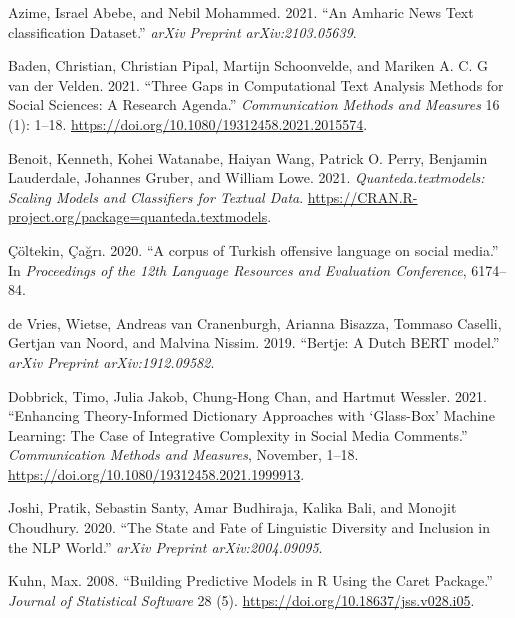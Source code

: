 \documentclass[
]{ccr}
\newlength{\cslhangindent}
\newlength{\cslentryspacingunit} %
\newenvironment{CSLReferences}[2] %
 {%
  \setlength{\parindent}{0pt}
  \ifodd #1
  \let\oldpar\par
  \def\par{\hangindent=\cslhangindent\oldpar}
  \fi
  \setlength{\parskip}{#2\cslentryspacingunit}
 }%
 {}
\begin{document}
\hypertarget{refs}{}
\begin{CSLReferences}{1}{0}
\leavevmode{}%
Azime, Israel Abebe, and Nebil Mohammed. 2021. {``{An Amharic News Text
classification Dataset}.''} \emph{arXiv Preprint arXiv:2103.05639}.

\leavevmode{}%
Baden, Christian, Christian Pipal, Martijn Schoonvelde, and Mariken A.
C. G van der Velden. 2021. {``Three Gaps in Computational Text Analysis
Methods for Social Sciences: A Research Agenda.''} \emph{Communication
Methods and Measures} 16 (1): 1--18.
\url{https://doi.org/10.1080/19312458.2021.2015574}.

\leavevmode{}%
Benoit, Kenneth, Kohei Watanabe, Haiyan Wang, Patrick O. Perry, Benjamin
Lauderdale, Johannes Gruber, and William Lowe. 2021.
\emph{Quanteda.textmodels: {Scaling Models and Classifiers for Textual
Data}}. \url{https://CRAN.R-project.org/package=quanteda.textmodels}.

\leavevmode{}%
Çöltekin, Çağrı. 2020. {``{A corpus of Turkish offensive language on
social media}.''} In \emph{Proceedings of the 12th Language Resources
and Evaluation Conference}, 6174--84.

\leavevmode{}%
de Vries, Wietse, Andreas van Cranenburgh, Arianna Bisazza, Tommaso
Caselli, Gertjan van Noord, and Malvina Nissim. 2019. {``{Bertje: A
Dutch BERT model}.''} \emph{arXiv Preprint arXiv:1912.09582}.

\leavevmode{}%
Dobbrick, Timo, Julia Jakob, Chung-Hong Chan, and Hartmut Wessler. 2021.
{``Enhancing Theory-Informed Dictionary Approaches with {`Glass-Box'}
Machine Learning: The Case of Integrative Complexity in Social Media
Comments.''} \emph{Communication Methods and Measures}, November, 1--18.
\url{https://doi.org/10.1080/19312458.2021.1999913}.

\leavevmode{}%
Joshi, Pratik, Sebastin Santy, Amar Budhiraja, Kalika Bali, and Monojit
Choudhury. 2020. {``The State and Fate of Linguistic Diversity and
Inclusion in the NLP World.''} \emph{arXiv Preprint arXiv:2004.09095}.

\leavevmode{}%
Kuhn, Max. 2008. {``Building Predictive Models in {R} Using the Caret
Package.''} \emph{Journal of Statistical Software} 28 (5).
\url{https://doi.org/10.18637/jss.v028.i05}.


\end{CSLReferences}
\end{document}
